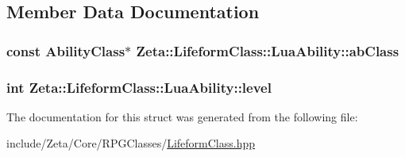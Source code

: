 \subsection{Member Data Documentation}
\hypertarget{structZeta_1_1LifeformClass_1_1LuaAbility_a729d1fa401b842ecc7d38c5eeb7eca2c}{
\subsubsection[{ab\+Class}]{\setlength{\rightskip}{0pt plus 5cm}const {\bf Ability\+Class}$\ast$ Zeta\+::\+Lifeform\+Class\+::\+Lua\+Ability\+::ab\+Class}}\label{structZeta_1_1LifeformClass_1_1LuaAbility_a729d1fa401b842ecc7d38c5eeb7eca2c}
\hypertarget{structZeta_1_1LifeformClass_1_1LuaAbility_a76846d56d9f5298ad5925987c5cd3e6c}{
\subsubsection[{level}]{\setlength{\rightskip}{0pt plus 5cm}int Zeta\+::\+Lifeform\+Class\+::\+Lua\+Ability\+::level}}\label{structZeta_1_1LifeformClass_1_1LuaAbility_a76846d56d9f5298ad5925987c5cd3e6c}


The documentation for this struct was generated from the following file\+:\begin{DoxyCompactItemize}
\item 
include/\+Zeta/\+Core/\+R\+P\+G\+Classes/\hyperlink{LifeformClass_8hpp}{Lifeform\+Class.\+hpp}\end{DoxyCompactItemize}
